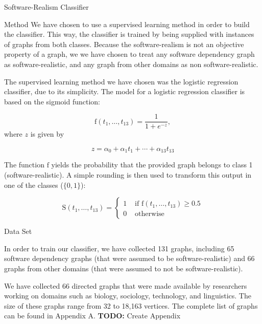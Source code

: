 \documentclass[11pt,twocolumn,a4paper,english]{article}
\newcommand{\TODO}{\textbf{TODO:} }
\begin{document}
\begin{section}{Software-Realism Classifier}
\begin{subsection}{Method}
We have chosen to use a supervised learning method in order to build the classifier. This way, the classifier is trained by being supplied with instances of graphs from both classes. Because the software-realism is not an objective property of a graph, we we have chosen to treat any software dependency graph as software-realistic, and any graph from other domains as non software-realistic.

The supervised learning method we have chosen was the logistic regression classifier, due to its simplicity. The model for a logistic regression classifier is based on the sigmoid function:

$$
	\mathrm{f}(t_1, \ldots, t_{13}) = \frac{1}{1 + e^{-z}}\mathrm{,}
$$
where $z$ is given by

$$
  z = \alpha_0 + \alpha_1t_1 + \cdots + \alpha_{13}t_{13}
$$

The function $\mathrm{f}$ yields the probability that the provided graph belongs to class 1 (software-realistic). A simple rounding is then used to transform this output in one of the classes ($\{0, 1\}$):

$$
\mathrm{S}(t_1, \ldots, t_{13}) = \left\{ \begin{array}{rl}
 1 &\mbox{ if } \mathrm{f}(t_1, \ldots, t_{13}) \ge 0.5 \\
 0 &\mbox{ otherwise}
       \end{array} \right.
$$
% 
% 

\begin{subsubsection}{Data Set} \label{sec:data-set}
	
	In order to train our classifier, we have collected 131 graphs, including 65 software dependency graphs (that were assumed to be software-realistic) and 66 graphs from other domains (that were assumed to not be software-realistic).
	
	We have collected 66 directed graphs that were made available by researchers working on domains such as biology, sociology, technology, and linguistics. The size of these graphs range from 32 to 18,163 vertices. The complete list of graphs can be found in Appendix A. \TODO Create Appendix
	

\end{subsubsection}
\end{subsection}
\end{section}
\end{document}
